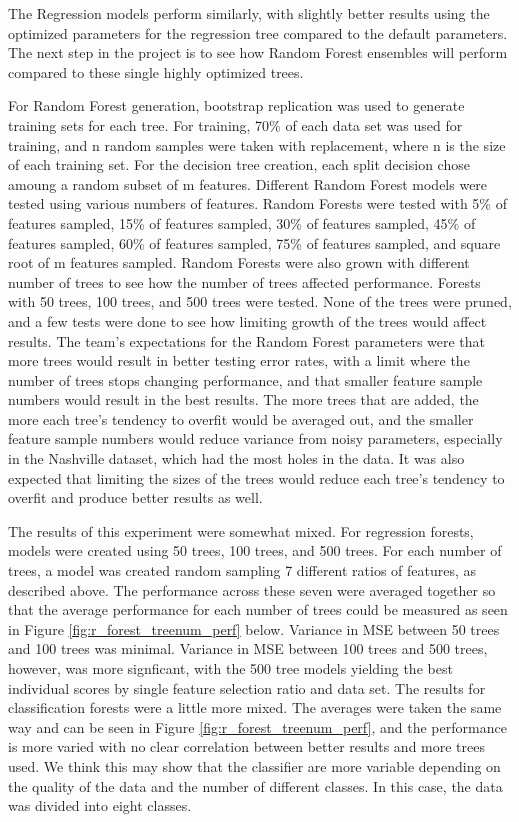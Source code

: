 \documentclass[10pt]{article}
\begin{document}
\begin{multicols}{2}
		The Regression models perform similarly, with slightly better results using the optimized parameters for the regression tree compared to the default parameters. The next step in the project is to see how Random Forest ensembles will perform compared to these single highly optimized trees.

		For Random Forest generation, bootstrap replication was used to generate training sets for each tree. For training, 70\% of each data set was used for training, and n random samples were taken with replacement, where n is the size of each training set. For the decision tree creation, each split decision chose amoung a random subset of m features. Different Random Forest models were tested using various numbers of features. Random Forests were tested with 5\% of features sampled, 15\% of features sampled, 30\% of features sampled, 45\% of features sampled, 60\% of features sampled, 75\% of features sampled, and square root of m features sampled. Random Forests were also grown with different number of trees to see how the number of trees affected performance. Forests with 50 trees, 100 trees, and 500 trees were tested. None of the trees were pruned, and a few tests were done to see how limiting growth of the trees would affect results. 
		The team's expectations for the Random Forest parameters were that more trees would result in better testing error rates, with a limit where the number of trees stops changing performance, and that smaller feature sample numbers would result in the best results. The more trees that are added, the more each tree's tendency to overfit would be averaged out, and the smaller feature sample numbers would reduce variance from noisy parameters, especially in the Nashville dataset, which had the most holes in the data. It was also expected that limiting the sizes of the trees would reduce each tree's tendency to overfit and produce better results as well. 

		The results of this experiment were somewhat mixed. For regression forests, models were created using 50 trees, 100 trees, and 500 trees. For each number of trees, a model was created random sampling 7 different ratios of features, as described above. The performance across these seven were averaged together so that the average performance for each number of trees could be measured as seen in Figure \ref{fig:r_forest_treenum_perf} below. Variance in MSE between 50 trees and 100 trees was minimal. Variance in MSE between 100 trees and 500 trees, however, was more signficant, with the 500 tree models yielding the best individual scores by single feature selection ratio and data set. The results for classification forests were a little more mixed. The averages were taken the same way and can be seen in Figure \ref{fig:r_forest_treenum_perf}, and the performance is more varied with no clear correlation between better results and more trees used. We think this may show that the classifier are more variable depending on the quality of the data and the number of different classes. In this case, the data was divided into eight classes. 


\end{multicols}
\end{document}
